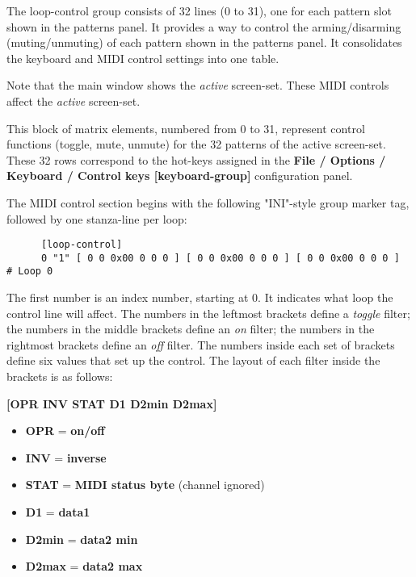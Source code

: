    The loop-control group consists of 32 lines (0 to 31), one for each
   pattern slot shown in the patterns panel.
   It provides a way to control the arming/disarming (muting/unmuting) of
   each pattern shown in the patterns panel.
   It consolidates the keyboard and MIDI control settings into one table.

   Note that the main window shows the \textsl{active} screen-set.
   These MIDI controls affect the \textsl{active} screen-set.

   This block of matrix elements, numbered from 0 to 31,
   represent control functions (toggle, mute, unmute) for the 32 patterns
   of the active screen-set.
   These 32 rows correspond to the hot-keys assigned in
   the \textbf{File / Options / Keyboard / Control keys [keyboard-group]} 
   configuration panel.

   The MIDI control section begins with the following "INI"-style
   group marker tag, followed by one stanza-line per loop:

   \begin{verbatim}
      [loop-control]
      0 "1" [ 0 0 0x00 0 0 0 ] [ 0 0 0x00 0 0 0 ] [ 0 0 0x00 0 0 0 ]  # Loop 0
   \end{verbatim}

   The first number is an index number, starting at 0.  It indicates what
   loop the control line will affect.
   The numbers in the leftmost brackets define a \textsl{toggle} filter;
   the numbers in the middle brackets define an \textsl{on} filter;
   the numbers in the rightmost brackets define an \textsl{off} filter.
   The numbers inside each set of brackets define six values that set up the
   control.  The layout of each filter inside the brackets is as follows:

      \textbf{[OPR INV STAT D1 D2min D2max]}

   \begin{itemize}
      \item \textbf{OPR} = \textbf{on/off}
      \item \textbf{INV} = \textbf{inverse}
      \item \textbf{STAT} = \textbf{MIDI status byte} (channel ignored) 
      \item \textbf{D1} = \textbf{data1}
      \item \textbf{D2min} = \textbf{data2 min}
      \item \textbf{D2max} = \textbf{data2 max}
   \end{itemize}


